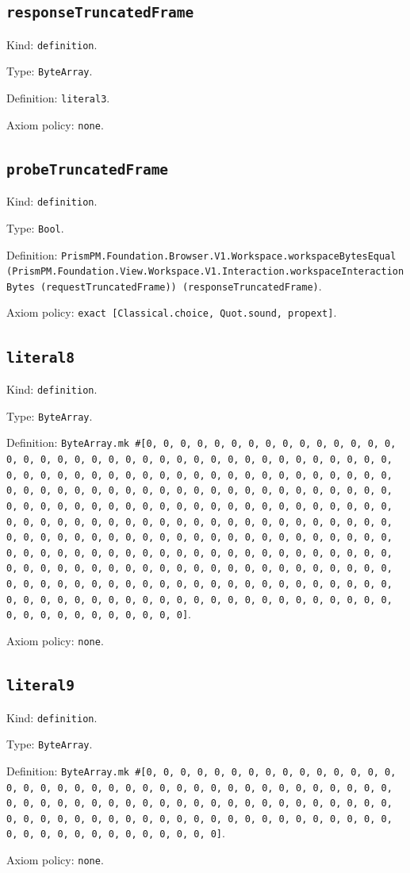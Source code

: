 \documentclass[11pt]{article}
\begin{document}
\subsection*{\texttt{responseTruncatedFrame}}
\noindent Kind: \texttt{definition}.\par
\noindent Type: \texttt{ByteArray}.\par
\noindent Definition: \texttt{literal3}.\par
\noindent Axiom policy: \texttt{none}.\par
\subsection*{\texttt{probeTruncatedFrame}}
\noindent Kind: \texttt{definition}.\par
\noindent Type: \texttt{Bool}.\par
\noindent Definition: \texttt{PrismPM.Foundation.Browser.V1.Workspace.workspaceBytesEqual (PrismPM.Foundation.View.Workspace.V1.Interaction.workspaceInteractionBytes (requestTruncatedFrame)) (responseTruncatedFrame)}.\par
\noindent Axiom policy: \texttt{exact [Classical.choice, Quot.sound, propext]}.\par
\subsection*{\texttt{literal8}}
\noindent Kind: \texttt{definition}.\par
\noindent Type: \texttt{ByteArray}.\par
\noindent Definition: \texttt{ByteArray.mk \#[0, 0, 0, 0, 0, 0, 0, 0, 0, 0, 0, 0, 0, 0, 0, 0, 0, 0, 0, 0, 0, 0, 0, 0, 0, 0, 0, 0, 0, 0, 0, 0, 0, 0, 0, 0, 0, 0, 0, 0, 0, 0, 0, 0, 0, 0, 0, 0, 0, 0, 0, 0, 0, 0, 0, 0, 0, 0, 0, 0, 0, 0, 0, 0, 0, 0, 0, 0, 0, 0, 0, 0, 0, 0, 0, 0, 0, 0, 0, 0, 0, 0, 0, 0, 0, 0, 0, 0, 0, 0, 0, 0, 0, 0, 0, 0, 0, 0, 0, 0, 0, 0, 0, 0, 0, 0, 0, 0, 0, 0, 0, 0, 0, 0, 0, 0, 0, 0, 0, 0, 0, 0, 0, 0, 0, 0, 0, 0, 0, 0, 0, 0, 0, 0, 0, 0, 0, 0, 0, 0, 0, 0, 0, 0, 0, 0, 0, 0, 0, 0, 0, 0, 0, 0, 0, 0, 0, 0, 0, 0, 0, 0, 0, 0, 0, 0, 0, 0, 0, 0, 0, 0, 0, 0, 0, 0, 0, 0, 0, 0, 0, 0, 0, 0, 0, 0, 0, 0, 0, 0, 0, 0, 0, 0, 0, 0, 0, 0, 0, 0, 0, 0, 0, 0, 0, 0, 0, 0, 0, 0, 0, 0, 0, 0, 0, 0, 0, 0, 0, 0, 0, 0, 0, 0, 0, 0, 0, 0, 0, 0, 0, 0, 0, 0, 0, 0, 0, 0, 0, 0, 0, 0, 0, 0, 0, 0, 0, 0, 0, 0, 0, 0, 0, 0, 0, 0]}.\par
\noindent Axiom policy: \texttt{none}.\par
\subsection*{\texttt{literal9}}
\noindent Kind: \texttt{definition}.\par
\noindent Type: \texttt{ByteArray}.\par
\noindent Definition: \texttt{ByteArray.mk \#[0, 0, 0, 0, 0, 0, 0, 0, 0, 0, 0, 0, 0, 0, 0, 0, 0, 0, 0, 0, 0, 0, 0, 0, 0, 0, 0, 0, 0, 0, 0, 0, 0, 0, 0, 0, 0, 0, 0, 0, 0, 0, 0, 0, 0, 0, 0, 0, 0, 0, 0, 0, 0, 0, 0, 0, 0, 0, 0, 0, 0, 0, 0, 0, 0, 0, 0, 0, 0, 0, 0, 0, 0, 0, 0, 0, 0, 0, 0, 0, 0, 0, 0, 0, 0, 0, 0, 0, 0, 0, 0, 0, 0, 0, 0, 0, 0]}.\par
\noindent Axiom policy: \texttt{none}.\par
\end{document}

